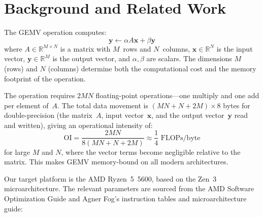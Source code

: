 \documentclass[runningheads]{llncs}
\begin{document}
\section{Background and Related Work}
\label{sec:gemv_op}

The GEMV operation computes:
\begin{equation}
\mathbf{y} \leftarrow \alpha A \mathbf{x} + \beta \mathbf{y}
\label{eq:gemv}
\end{equation}
where $A \in \mathbb{R}^{M \times N}$ is a matrix with $M$~rows and $N$~columns,
$\mathbf{x} \in \mathbb{R}^N$ is the input vector,
$\mathbf{y} \in \mathbb{R}^M$ is the output vector, and $\alpha, \beta$ are
scalars. The dimensions $M$ (rows) and $N$ (columns) determine both the
computational cost and the memory footprint of the operation.

The operation requires $2MN$ floating-point operations---one multiply and one add
per element of~$A$. The total data movement is $(MN + N + 2M) \times 8$ bytes
for double-precision (the matrix~$A$, input vector~$\mathbf{x}$, and the
output vector~$\mathbf{y}$ read and written), giving an operational intensity\cite{roofline} of:
\begin{equation}
\text{OI} = \frac{2MN}{8(MN + N + 2M)} \approx \frac{1}{4} \text{ FLOPs/byte}
\label{eq:ai}
\end{equation}
for large $M$ and $N$, where the vector terms become negligible relative to the
matrix. This makes GEMV memory-bound on all modern
architectures.

Our target platform is the AMD Ryzen~5~5600, based on the Zen~3
microarchitecture. The relevant parameters are sourced from the AMD Software
Optimization Guide\cite{amdsog} and Agner Fog's instruction
tables\cite{fog2011instruction} and microarchitecture guide\cite{fog2017microarchitecture}:
\end{document}
